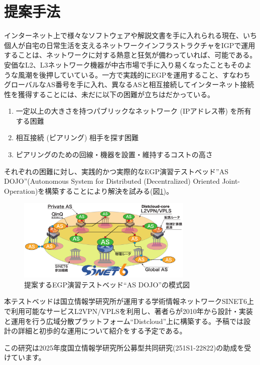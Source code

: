 \documentclass[Japanese]{dicomopapers}
\begin{document}
\section{提案手法}

インターネット上で様々なソフトウェアや解説文書を手に入れられる現在、いち個人が自宅の日常生活を支えるネットワークインフラストラクチャをIGPで運用することは、ネットワークに対する熱意と狂気が備わっていれば、可能である。安価なL2、L3ネットワーク機器が中古市場で手に入り易くなったこともそのような風潮を後押していている。一方で実践的にEGPを運用すること、すなわちグローバルなAS番号を手に入れ、異なるASと相互接続してインターネット接続性を獲得することには、未だに以下の困難が立ちはだかっている。

\begin{enumerate}
 \item 一定以上の大きさを持つパブリックなネットワーク (IPアドレス帯) を所有する困難
 \item 相互接続 (ピアリング) 相手を探す困難
 \item ピアリングのための回線・機器を設置・維持するコストの高さ
\end{enumerate}

それぞれの困難に対し、実践的かつ実際的なEGP演習テストベッド''AS DOJO''(Autonomous System for Distributed (Decentralized) Oriented Joint-Operation)を構築することにより解決を試みる(図\ref{AS_dojo})。

\begin{figure}[h]
\begin{center}
\includegraphics[width=84mm,clip]{AS_dojo.pdf}
\caption{提案するEGP演習テストベッド``AS DOJO''の模式図}
\label{AS_dojo}
\end{center}
\end{figure}

本テストベッドは国立情報学研究所が運用する学術情報ネットワークSINET6上で利用可能なサービスL2VPN/VPLSを利用し、著者らが2010年から設計・実装と運用を行う広域分散プラットフォーム``Distcloud''上に構築する。予稿では設計の詳細と初歩的な運用について紹介をする予定である。

\begin{acknowledgment}
この研究は2025年度国立情報学研究所公募型共同研究(251S1-22822)の助成を受けています。
\end{acknowledgment}

\section*{}
\end{document}
